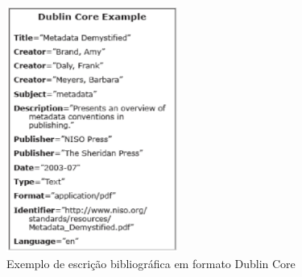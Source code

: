 \graphicspath{{figuras/}}
\begin{figure}[H]
\centering
\includegraphics[width=0.5\textwidth]{exemplo_dublincore}
\caption{Exemplo de escrição bibliográfica em formato Dublin Core}
\label{fig:exdublincore}
\end{figure}



